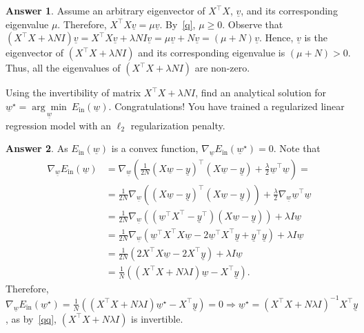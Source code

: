 \documentclass{article}
\theoremstyle{definition}
\newtheorem*{answer}{Answer}
\begin{document}
\begin{question}[start=0]
\begin{question}
			\begin{answer}
				Assume an arbitrary eigenvector of $X^\top X$, $\underline{v}$, and its corresponding eigenvalue $\mu$. Therefore, $X^\top X \underline{v} = \mu \underline{v}$. By~\ref{q}, $\mu \geq 0$. Observe that $(X^\top X + \lambda N  I) \underline{v} = X^\top X \underline{v} + \lambda N  I \underline{v} = \mu \underline{v} + N \underline{v} = (\mu + N) \underline{v}$. Hence, $\underline{v}$ is the eigenvector of $(X^\top X + \lambda N  I)$ and its corresponding eigenvalue is $(\mu + N) > 0$. Thus, all the eigenvalues of $(X^\top X + \lambda N  I)$ are non-zero.
			\end{answer}
			\item Using the invertibility of matrix $X^\top X + \lambda N  I$, find an analytical solution for $\underline{w}^\star = \underset{\underline{w}}{\arg \min}~E_{\text{in}}(\underline{w})$. Congratulations! You have trained a regularized linear regression model with an $\ell_2$ regularization penalty.
			\begin{answer}
				As $E_{\text{in}}(\underline{w})$ is a convex function, $\nabla_{\!\underline{w}}E_{\text{in}}(\underline{w}^\star) = 0$. Note that 
				\begin{align*}
					\nabla_{\!\underline{w}}E_{\text{in}}(\underline{w})  &= \nabla_{\!\underline{w}}(\frac{1}{2N} (X \underline{w} - \underline{y})^\top (X \underline{w} - \underline{y}) + \frac{\lambda}{2} \underline{w}^\top \underline{w}) =\\
					&= \frac{1}{2N} \nabla_{\!\underline{w}}\left((X \underline{w} - \underline{y})^\top (X \underline{w} - \underline{y})\right)+\frac{\lambda}{2} \nabla_{\!\underline{w}} \underline{w}^\top \underline{w}\\
					&= \frac{1}{2N} \nabla_{\!\underline{w}}\left((\underline{w}^\top X^\top  - \underline{y}^\top) (X \underline{w} - \underline{y})\right)+\lambda I \underline{w}\\
					&= \frac{1}{2N} \nabla_{\!\underline{w}}\left(\underline{w}^\top X^\top X \underline{w} - 2\underline{w}^\top X^\top \underline{y}  + \underline{y}^\top \underline{y}\right)+\lambda I \underline{w}\\
					&= \frac{1}{2N} \left(2 X^\top X \underline{w} - 2 X^\top \underline{y}\right)+\lambda I \underline{w}\\
					&= \frac{1}{N} \left((X^\top X + N \lambda I) \underline{w} - X^\top \underline{y}\right).
				\end{align*}
				Therefore, $\nabla_{\!\underline{w}}E_{\text{in}}(\underline{w}^\star) = \frac{1}{N} \left((X^\top X + N \lambda I) \underline{w}^\star - X^\top \underline{y}\right) = 0 \Rightarrow \underline{w}^\star = (X^\top X + N \lambda I)^{-1} X^\top \underline{y}$, as by~\ref{qq}, $(X^\top X + N \lambda I)$ is invertible.

\end{answer}
\end{question}
\end{question}
\end{document}
